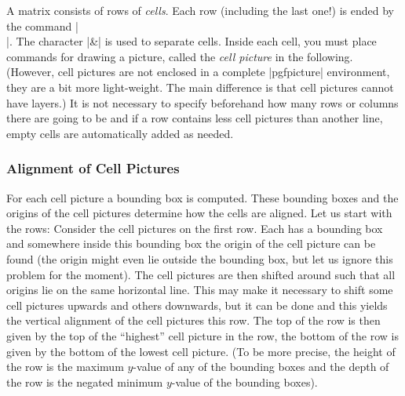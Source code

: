 A matrix consists of rows of \emph{cells}. Each row (including the last one!)
is ended by the command |\\|. The character |&| is used to separate cells.
Inside each cell, you must place commands for drawing a picture, called the
\emph{cell picture} in the following. (However, cell pictures are not enclosed
in a complete |{pgfpicture}| environment, they are a bit more light-weight. The
main difference is that cell pictures cannot have layers.) It is not necessary
to specify beforehand how many rows or columns there are going to be and if a
row contains less cell pictures than another line, empty cells are
automatically added as needed.


\subsubsection{Alignment of Cell Pictures}

For each cell picture a bounding box is computed. These bounding boxes and the
origins of the cell pictures determine how the cells are aligned. Let us start
with the rows: Consider the cell pictures on the first row. Each has a bounding
box and somewhere inside this bounding box the origin of the cell picture can
be found (the origin might even lie outside the bounding box, but let us ignore
this problem for the moment). The cell pictures are then shifted around such
that all origins lie on the same horizontal line. This may make it necessary to
shift some cell pictures upwards and others downwards, but it can be done and
this yields the vertical alignment of the cell pictures this row. The top of
the row is then given by the top of the ``highest'' cell picture in the row,
the bottom of the row is given by the bottom of the lowest cell picture. (To be
more precise, the height of the row is the maximum $y$-value of any of the
bounding boxes and the depth of the row is the negated minimum $y$-value of the
bounding boxes).
%
\begin{codeexample}[]
\end{codeexample}

